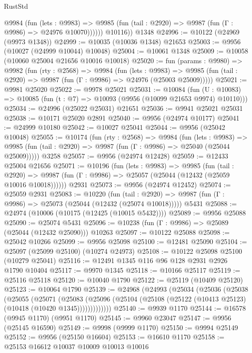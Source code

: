 \begin{lexlean}{RustStd}
\begin{coremodule}
            @9984
              (fun (lets : @9983) =>
              @9985 (fun (tail : @2920) => @9987 (fun (Γ : @9986) => @24976 @10070))))))
        @10116))
    @1348
@24996 := @10122 (@24969 (@9973 @1348))
@24999 := @10035 (@10036 @1348) @21653
@25003 := @9956 (@10027 (@24999 @10044) @10048)
@25004 := @10061 @1348
@25009 := @10058 (@10060 @25004 @21656 @10016 @10018)
@25020 := fun (params : @9980) =>
  @9982
    (fun (rty : @2568) =>
    @9984
      (fun (lets : @9983) =>
      @9985 (fun (tail : @2920) => @9987 (fun (Γ : @9986) => @24976 (@25003 @25009)))))
@25021 := @9981 @25020
@25022 := @9978 @25021
@25031 := @10084
    (fun (U : @10083) => @10085 (fun (t : @7) => @10093 (@9956 (@10099 @21653 @9974) @10110)))
@25034 := @24996 (@25022 @25031) @21651
@25036 := @9941 @25021 @25031
@25038 := @10171 @25020 @2891
@25040 := @9956 (@24974 @10177)
@25041 := @24999 @10180
@25042 := @10027 @25041
@25044 := @9956 (@25042 @10048)
@25055 := @10174
    (fun (rty : @2568) =>
    @9984
      (fun (lets : @9983) =>
      @9985 (fun (tail : @2920) => @9987 (fun (Γ : @9986) => @25040 (@25044 @25009)))))
    @3258
@25057 := @9956 (@24974 @12428)
@25059 := @12433 @25004 @21656
@25071 := @10196
    (fun (lets : @9983) =>
    @9985
      (fun (tail : @2920) =>
      @9987 (fun (Γ : @9986) => @25057 (@25044 (@12432 (@25059 @10016 @10018))))))
    @2931
@25073 := @9956 (@24974 @12452)
@25074 := @25059 @2931
@25083 := @10220
    (fun (tail : @2920) => @9987 (fun (Γ : @9986) => @25073 (@25044 (@12432 (@25074 @10018)))))
    @5431
@25088 := @24974 (@10006 (@10175 (@12425 (@10015 @5432))))
@25089 := @9956 @25088
@25090 := @25074 @5431
@25096 := @10238 (fun (Γ : @9986) => @25089 (@25044 (@12432 @25090))) @10263
@25097 := @10122 @25088
@25098 := @25042 @10266
@25099 := @9956 @25098
@25100 := @12481 @25090
@25104 := @25097 (@25099 @25100) (@10274 @24973)
@25108 := @10122 @25098 @25100 (@10279 @25041)
@25116 := @12491 @1345 @116 @96 @128 @2931 @2926 @1790 @10404
@25117 := @9970 @1345
@25118 := @10166 @25117
@25119 := @25116 @25118
@25120 := @10040 @1790
@25122 := @25119 (@10409 @25120)
@25123 := @10064 @1790
@25139 := @24968
    (@24993
      (@25034
        (@25036
          (@25038
            (@25055
              (@25071
                (@25083
                  (@25096 (@25104 (@25108 (@25122 (@10413 @25123) (@10418 (@10420 @1345)))))))))))))
@25140 := @9939 @1170
@25144 := @16578 (@9945 @1170) (@9951 @1170)
@25145 := @9960 @23047
@25147 := @9956 (@25145 @16590)
@25149 := @9998 (@9999 @1170)
@25150 := @9994 @25149
@25152 := @9956 (@25150 @16604)
@25153 := @16610 @1170
@25158 := @25153 @16612 @10037 @10009 @10013 @10016

\end{coremodule}
\end{lexlean}
